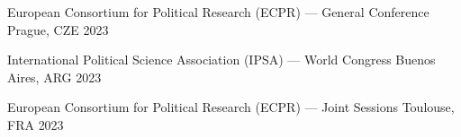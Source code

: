 





\hspace{2.25mm}{\footnotesize $^\star$ Selection of only the last five years}

\vspace{1mm}

\begin{cvhonors}
\cvconf
{European Consortium for Political Research (ECPR) --- General Conference} 
{Prague, CZE}
{2023}
\end{cvhonors}

\begin{cvhonors}
\cvconf
{International Political Science Association (IPSA) --- World Congress} 
{Buenos Aires, ARG}
{2023}
\end{cvhonors}



\begin{cvhonors}
\cvconf
{European Consortium for Political Research (ECPR) --- Joint Sessions} 
{Toulouse, FRA}
{2023}
\end{cvhonors}

